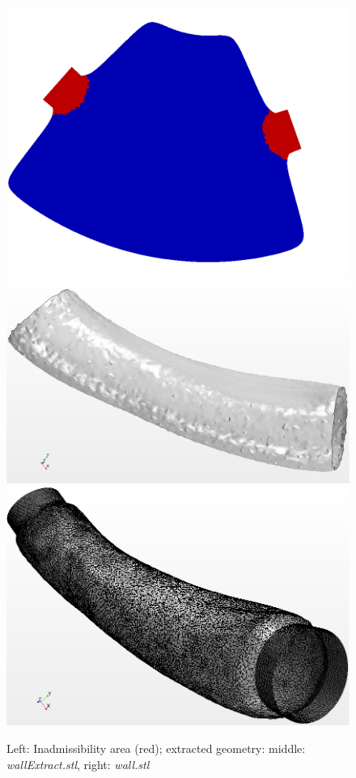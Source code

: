 \documentclass[oneside]{article}
\numberwithin{equation}{section}
\numberwithin{figure}{section}
\numberwithin{figure}{section}
\begin{document}
\begin{figure}[htbp]
    \centering
    \includegraphics[scale=0.1]{TS2e5feasible.png}
    \includegraphics[scale=0.1]{TS2e5expSTL.png}
    \includegraphics[scale=0.12]{TS2e5close2.png} 
    \caption{Left: Inadmissibility area (red); extracted geometry: middle: \emph{wallExtract.stl}, right: \emph{wall.stl}}
    \label{extract3}
\end{figure}
\end{document}
